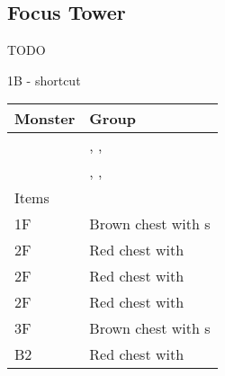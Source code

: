 \subsection{Focus Tower}
\label{map:focus_tower}

TODO

1B - shortcut 

\noindent\begin{tabularx}{\textwidth}[l]{lX}
	Monster & Group
\\ \hline
	\nameref{monster:minotaur_zombie}
	& \nameref{monster:minotaur_zombie}, \nameref{monster:shadow}, \nameref{monster:iflyte} \\
	& \nameref{monster:minotaur_zombie}, \nameref{monster:shadow}, \nameref{monster:chimera}
\\ \hline
	Items \\
	1F & Brown chest with \nameref{weapon:bomb}s \\
	2F & Red chest with \nameref{spell:fire} \\
	2F & Red chest with \nameref{armor:venus_shield} \\
	2F & Red chest with \nameref{spell:blizzard} \\
	3F & Brown chest with \nameref{item:cure_potion}s \\
	B2 & Red chest with \nameref{spell:aero}
\end{tabularx}
